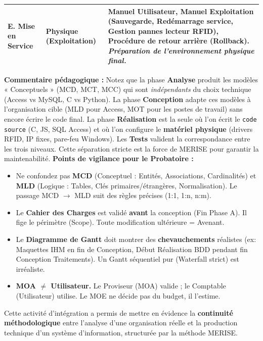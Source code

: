 \documentclass[11pt]{article}
\newcounter{popsec}
\newcounter{popsub}
\newcommand{\courssub}[1]{%
  \stepcounter{popsub}%
  \par\vspace{9pt}\noindent{\popxbold\fontsize{11.5}{13}\selectfont\color{popink}{\color{poporange}\thepopsec.\thepopsub}\hspace{6pt}#1}\par\nopagebreak\vspace{4pt}
}
\begin{document}
\begin{exoresolu}
\begin{center}
\begin{tabularx}{\linewidth}{|l|X|X|}
\textbf{E. Mise en Service} & \textbf{Physique (Exploitation)} & \textbf{Manuel Utilisateur}, \textbf{Manuel Exploitation} (Sauvegarde, Redémarrage service, Gestion pannes lecteur RFID), \textbf{Procédure de retour arrière (Rollback)}. \emph{Préparation de l'environnement physique final.} \\\hline
\end{tabularx}
\end{center}

\textbf{Commentaire pédagogique :} Notez que la phase \textbf{Analyse} produit les modèles « Conceptuels » (MCD, MCT, MCC) qui sont \emph{indépendants} du choix technique (Access vs MySQL, C vs Python). La phase \textbf{Conception} adapte ces modèles à l'organisation cible (MLD pour Access, MOT pour les postes de travail) sans encore écrire le code final. La phase \textbf{Réalisation} est la seule où l'on écrit le \texttt{code source} (C, JS, SQL Access) et où l'on configure le \textbf{matériel physique} (drivers RFID, IP fixes, pare-feu Windows). Les \textbf{Tests} valident la correspondance entre les trois niveaux. Cette séparation stricte est la force de MERISE pour garantir la maintenabilité.
\tcblower
\textbf{Points de vigilance pour le Probatoire :}
\begin{itemize}
    \item Ne confondez pas \textbf{MCD} (Conceptuel : Entités, Associations, Cardinalités) et \textbf{MLD} (Logique : Tables, Clés primaires/étrangères, Normalisation). Le passage MCD $\rightarrow$ MLD suit des règles précises (1:1, 1:n, n:m).
    \item Le \textbf{Cahier des Charges} est validé \textbf{avant} la conception (Fin Phase A). Il fige le périmètre (Scope). Toute modification ultérieure = Avenant.
    \item Le \textbf{Diagramme de Gantt} doit montrer des \textbf{chevauchements} réalistes (ex: Maquettes IHM en fin de Conception, Début Réalisation BDD pendant fin Conception Traitements). Un Gantt séquentiel pur (Waterfall strict) est irréaliste.
    \item \textbf{MOA $\neq$ Utilisateur.} Le Proviseur (MOA) valide ; le Comptable (Utilisateur) utilise. Le MOE ne décide pas du budget, il l'estime.
\end{itemize}
\end{exoresolu}

\courssub{Bilan de l'activité}
Cette activité d'intégration a permis de mettre en évidence la \textbf{continuité méthodologique} entre l'analyse d'une organisation réelle et la production technique d'un système d'information, structurée par la méthode MERISE.
\end{document}
